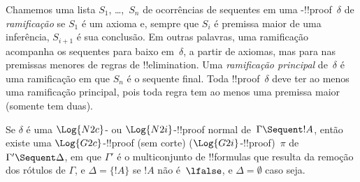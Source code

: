 \documentclass[../../../include/open-logic-section]{subfiles}
\begin{document}
Chamemos uma lista $S_1$, \dots,~$S_n$ de ocorrências de sequentes em uma
-!!{proof}~$\delta$ de \emph{ramificação} se $S_1$ é um axioma e,
sempre que $S_i$ é premissa maior de uma inferência, $S_{i+1}$ é sua
conclusão. Em outras palavras, uma ramificação acompanha os sequentes para
baixo em~$\delta$, a partir de axiomas, mas para nas premissas menores de
regras de !!{elimination}. Uma \emph{ramificação principal} de~$\delta$ é uma
ramificação em que $S_n$ é o sequente final. Toda !!{proof}~$\delta$ deve ter
ao menos uma ramificação principal, pois toda regra tem ao menos uma premissa
maior (somente \Intro{\land} tem duas).


\begin{prop} Se $\delta$ é uma
$\Log{N2c}$- ou $\Log{N2i}$-!!{proof} normal de~$\Gamma \Sequent !A$,
então existe uma $\Log{G2c}$-!!{proof} (sem corte)
($\Log{G2i}$-!!{proof})~$\pi$ de $\Gamma' \Sequent \Delta$, em que
$\Gamma'$ é o multiconjunto de !!{formula}s que resulta da remoção dos
rótulos de $\Gamma$, e $\Delta = \{!A\}$ se $!A$ não é~$\lfalse$, e
$\Delta = \emptyset$ caso seja.
\end{prop}
\end{document}
